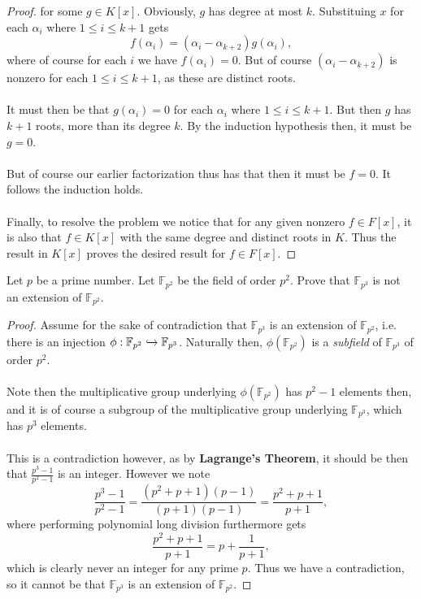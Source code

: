 \documentclass[12pt]{article}
\newenvironment{ex}[2][Exercise]{\begin{trivlist}
\item[\hskip \labelsep {\bfseries #1}\hskip \labelsep {\bfseries #2.}]}{\end{trivlist}}
\begin{document}
\begin{ex}{2}
\begin{proof}
        for some $g \in K[x]$. Obviously, $g$ has degree at most $k$. Substituing $x$ for each $\alpha_i$ where $1 \leq i \leq k + 1$ gets
        $$f(\alpha_i) = (\alpha_i - \alpha_{k + 2})g(\alpha_i),$$
        where of course for each $i$ we have $f(\alpha_i) = 0$.  But of course $(\alpha_i - \alpha_{k + 2})$ is nonzero for each $1 \leq i \leq k + 1$, as these are distinct roots. \\ \\
        It must then be that $g(\alpha_i) = 0$ for each $\alpha_i$ where $1 \leq i \leq k + 1$. But then $g$ has $k + 1$ roots, more than its degree $k$. By the induction hypothesis then, it must be $g = 0$. \\ \\
        But of course our earlier factorization thus has that then it must be $f = 0$. It follows the induction holds. \\ \\
        Finally, to resolve the problem we notice that for any given nonzero $f \in F[x]$, it is also that $f \in K[x]$ with the same degree and distinct roots in $K$. Thus the result in $K[x]$ proves the desired result for $f \in F[x]$.
    \end{proof}

\end{ex}

\begin{ex}{3}
    Let $p$ be a prime number. Let $\mathbb{F}_{p^2}$ be the field of order $p^2$. Prove that $\mathbb{F}_{p^3}$ is not an extension of $\mathbb{F}_{p^2}$. 
    \begin{proof}
        Assume for the sake of contradiction that $\mathbb{F}_{p^3}$ is an extension of $\mathbb{F}_{p^2}$, i.e. there is an injection $\phi: \mathbb{F}_{p^2} \xhookrightarrow{} \mathbb{F}_{p^3}$. Naturally then, $\phi(\mathbb{F}_{p^2})$ is a \textit{subfield} of $\mathbb{F}_{p^3}$ of order $p^2$. \\ \\
        Note then the multiplicative group underlying $\phi(\mathbb{F}_{p^2})$ has $p^2 - 1$ elements then, and it is of course a subgroup of the multiplicative group underlying $\mathbb{F}_{p^3}$, which has $p^3$ elements. \\ \\
        This is a contradiction however, as by \textbf{Lagrange's Theorem}, it should be then that $\frac{p^3 - 1}{p^2 - 1}$ is an integer. However we note 
        $$\frac{p^3 - 1}{p^2 - 1} = \frac{(p^2 + p + 1)(p - 1)}{(p + 1)(p -1)} = \frac{p^2 + p + 1}{p + 1},$$
        where performing polynomial long division furthermore gets 
        $$\frac{p^2 + p + 1}{p + 1} = p + \frac{1}{p+1},$$
        which is clearly never an integer for any prime $p$. Thus we have a contradiction, so it cannot be that $\mathbb{F}_{p^3}$ is an extension of $\mathbb{F}_{p^2}$.
    \end{proof}
\end{ex}
\end{document}
